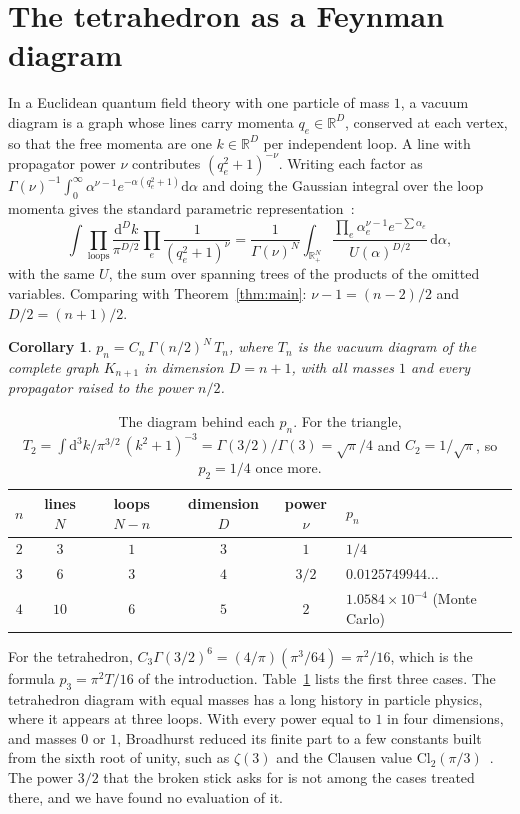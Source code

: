 \documentclass[11pt]{article}
\newtheorem{corollary}{Corollary}
\theoremstyle{remark}
\newcommand{\R}{\mathbb{R}}
\newcommand{\dd}{\mathrm{d}}
\begin{document}
\section{The tetrahedron as a Feynman diagram}\label{sec:feynman}

In a Euclidean quantum field theory with one particle of mass $1$, a vacuum diagram is a graph whose lines
carry momenta $q_e\in\R^D$, conserved at each vertex, so that the free momenta are one $k\in\R^D$ per
independent loop. A line with propagator power $\nu$ contributes $(q_e^2+1)^{-\nu}$. Writing each factor as
$\Gamma(\nu)^{-1}\int_0^\infty\alpha^{\nu-1}e^{-\alpha(q_e^2+1)}\dd\alpha$ and doing the Gaussian integral over
the loop momenta gives the standard parametric representation~\cite[eqs.~(7)--(9) and Section~4]{BW10}:
\[
\int\prod_{\text{loops}}\frac{\dd^Dk}{\pi^{D/2}}\prod_e\frac1{(q_e^2+1)^{\nu}}
=\frac1{\Gamma(\nu)^N}\int_{\R_+^N}\frac{\prod_e\alpha_e^{\nu-1}e^{-\sum\alpha_e}}{U(\alpha)^{D/2}}\,\dd\alpha,
\]
with the same $U$, the sum over spanning trees of the products of the omitted variables. Comparing with
Theorem~\ref{thm:main}: $\nu-1=(n-2)/2$ and $D/2=(n+1)/2$.

\begin{corollary}\label{cor:feynman}
$p_n=C_n\,\Gamma(n/2)^N\,T_n$, where $T_n$ is the vacuum diagram of the complete graph $K_{n+1}$ in
dimension $D=n+1$, with all masses $1$ and every propagator raised to the power $n/2$.
\end{corollary}

\begin{table}[ht]
\centering
\begin{tabular}{cccccl}
\toprule
$n$ & lines $N$ & loops $N-n$ & dimension $D$ & power $\nu$ & $p_n$\\
\midrule
$2$ & $3$ & $1$ & $3$ & $1$ & $1/4$\\
$3$ & $6$ & $3$ & $4$ & $3/2$ & $0.0125749944\ldots$\\
$4$ & $10$ & $6$ & $5$ & $2$ & $1.0584\times10^{-4}$ (Monte Carlo)\\
\bottomrule
\end{tabular}
\caption{The diagram behind each $p_n$. For the triangle, $T_2=\int\dd^3k/\pi^{3/2}\,(k^2+1)^{-3}=
\Gamma(3/2)/\Gamma(3)=\sqrt\pi/4$ and $C_2=1/\sqrt\pi$, so $p_2=1/4$ once more.}
\label{tab:diagrams}
\end{table}

For the tetrahedron, $C_3\Gamma(3/2)^6=(4/\pi)(\pi^3/64)=\pi^2/16$, which is the formula $p_3=\pi^2T/16$ of the
introduction. Table~\ref{tab:diagrams} lists the first three cases. The tetrahedron diagram with equal
masses has a long history in particle physics, where it appears at three loops. With every power equal
to $1$ in four dimensions, and masses $0$ or $1$, Broadhurst reduced its finite part to a few constants built
from the sixth root of unity, such as $\zeta(3)$ and the Clausen value $\mathrm{Cl}_2(\pi/3)$~\cite{Bro99}.
The power $3/2$ that the broken stick asks for is not among the cases treated there, and we have found no
evaluation of it.
\end{document}
